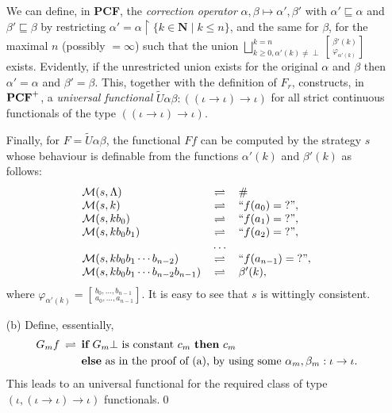 \documentclass[fleqn]{LMCS}
\theoremstyle{plain}\newtheorem{satz}[thm]{Satz}
\theoremstyle{plain}\newtheorem{hyp}[thm]{Hypothesis}
\theoremstyle{plain}\newtheorem{hyps}[thm]{Hypotheses}
\theoremstyle{definition}\newtheorem{note}[thm]{Note}
\newcommand{\restr}{\upharpoonright}
\newcommand{\setof}[1]{\{#1\}}
\newcommand{\bYdef}{\mathrel{\BYDEF}}
\newcommand{\BYDEF}{\mbox{$\hspace{.2em}\rightleftharpoons\hspace{.2em}$}}
\newcommand{\arr}{\rightarrow}
\newcommand{\NN}{\mathbf{N}}
\newcommand{\PCF}{\mbox{\bf PCF}}
\newcommand{\IF}{\mbox{\bf if}}
\newcommand{\THEN}{\mbox{\bf then}}
\newcommand{\ELSE}{\mbox{\bf else}}
\newcommand{\Undef}{{\perp}}
\newcommand{\MM}{{\mathcal M}}
\newcommand{\?}{\mbox{?}}
\begin{document}
\begin{enumerate}[(a)]
We can define, in \PCF, 
the \emph{correction operator} $\alpha,\beta\mapsto\alpha',\beta'$ 
with $\alpha'\sqsubseteq\alpha$ and $\beta'\sqsubseteq\beta$ 
by restricting $\alpha'=\alpha\restr\setof{k\in\NN\mid k\le n}$, and the same 
for $\beta$, for the maximal $n$ (possibly ${}=\infty$) such that 
the union 
$\bigsqcup^{k=n}_{k\ge0,\alpha'(k)\ne\Undef}
\left[\,_{\varphi_{\alpha'(k)}}^{\beta'(k)}\right]$
exists. 
Evidently, if the unrestricted union exists for the original 
$\alpha$ and $\beta$ then $\alpha'=\alpha$ and $\beta'=\beta$. 
This, together with the definition of $F_r$, 
constructs, in $\PCF^+$, a \emph{universal functional} 
$
\tilde{U}\alpha\beta:
((\iota\arr\iota)\arr\iota)
$
for all strict continuous functionals of the type $((\iota\arr\iota)\arr\iota)$.  


Finally, for $F=\tilde{U}\alpha\beta$, the functional 
$Ff$ can be computed by the strategy $s$ whose behaviour 
is definable from the functions $\alpha'(k)$ and $\beta'(k)$ as follows: 
\[
\begin{array}{lcl}
\MM(s,\Lambda) & \bYdef & \#
\\
\MM(s,k) & \bYdef & \mbox{``}f(a_0)=\?\mbox{''},
\\
\MM(s,kb_0) & \bYdef & \mbox{``}f(a_1)=\?\mbox{''},
\\
\MM(s,kb_0 b_1) & \bYdef & \mbox{``}f(a_2)=\?\mbox{''},
\\
& \ldots &
\\
\MM(s,kb_0 b_1\cdots b_{n-2}) & \bYdef & \mbox{``}f(a_{n-1})=\?\mbox{''},
\\
\MM(s,kb_0 b_1\cdots b_{n-2} b_{n-1}) & \bYdef & {\beta'(k)},
\end{array}
\]
where 
$
	\varphi_{\alpha'(k)} =
		 \left[\,^{b_0,\ldots,b_{n-1}}
		 _{a_0,\ldots,a_{n-1}}\right]
$.
It is easy to see that $s$ is wittingly consistent. 




\item[(b)] 
Define, essentially, 
\begin{align*}
G_m f  \bYdef &\; \IF\ G_m\Undef\ \textrm{is constant }c_m\ \THEN\ c_m\ 
\\
 & 
\;\ELSE\ \textrm{as in the proof of (a),}
\textrm{ by using some }\alpha_m,\beta_m:\iota\arr\iota. 
\end{align*}
This leads to an universal functional for the required class of 
type $(\iota,(\iota\arr\iota)\arr\iota)$ functionals.\qed
\end{enumerate}
\end{document}
